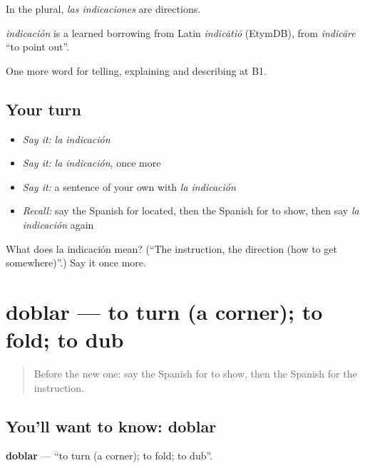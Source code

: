 In the plural, \emph{las indicaciones} are directions.

\begin{cousinweb}
\emph{indicación} is a learned borrowing from Latin \emph{indicātiō} (EtymDB), from \emph{indicāre} \textquotedblleft{}to point out\textquotedblright{}.
\end{cousinweb}

\begin{grammarlens}[title={What you've built}]
One more word for telling, explaining and describing at B1.
\end{grammarlens}

\subsection*{Your turn}
\begin{itemize}
\raggedright
  \item \emph{Say it:} \emph{la indicación}
  \item \emph{Say it:} \emph{la indicación}, once more
  \item \emph{Say it:} a sentence of your own with \emph{la indicación}
  \item \emph{Recall:} say the Spanish for located, then the Spanish for to show, then say \emph{la indicación} again
\end{itemize}

\begin{tcolorbox}[breakable,colback=teal!4,colframe=teal!35!black,title={Before you move on}]
What does la indicación mean? (\textquotedblleft{}The instruction, the direction (how to get somewhere)\textquotedblright{}.) Say it once more.
\end{tcolorbox}
\section[doblar]{doblar — to turn (a corner); to fold; to dub}

\label{lesson:ES-C670-doblar}



\begin{quote}
Before the new one: say the Spanish for to show, then the Spanish for the instruction.
\end{quote}

\subsection*{You'll want to know: doblar}
\textbf{doblar} — \textquotedblleft{}to turn (a corner); to fold; to dub\textquotedblright{}.

